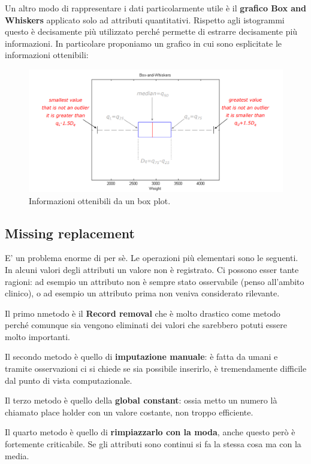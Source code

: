 Un altro modo di rappresentare i dati particolarmente utile è il \textbf{grafico Box and Whiskers} applicato solo ad attributi quantitativi. Rispetto agli istogrammi questo è decisamente più utilizzato perché permette di estrarre decisamente più informazioni. In particolare proponiamo un grafico in cui sono esplicitate le informazioni ottenibili:

\begin{figure}[H]
	\centering
	\includegraphics[height=0.4 \linewidth]{introduction/pict/box_plot.png}
	\caption{Informazioni ottenibili da un box plot.}
\end{figure}


\subsection{Missing replacement}

E' un problema enorme di per sè. Le operazioni più elementari sono le seguenti. In alcuni valori degli attributi un valore non è registrato. Ci possono esser tante ragioni: ad esempio un attributo non è sempre stato osservabile (penso all'ambito clinico), o ad esempio un attributo prima non veniva considerato rilevante.

Il primo nmetodo è il \textbf{Record removal} che è molto drastico come metodo perché comunque sia vengono eliminati dei valori che sarebbero potuti essere molto importanti.

Il secondo metodo è quello di \textbf{imputazione manuale}: è fatta da umani e tramite osservazioni ci si chiede se sia possibile inserirlo, è tremendamente difficile dal punto di vista computazionale.

Il terzo metodo è quello della \textbf{global constant}: ossia metto un numero là chiamato place holder con un valore costante, non troppo efficiente.

Il quarto metodo è quello di \textbf{rimpiazzarlo con la moda}, anche questo però è fortemente criticabile.
Se gli attributi sono continui si fa la stessa cosa ma con la media.

